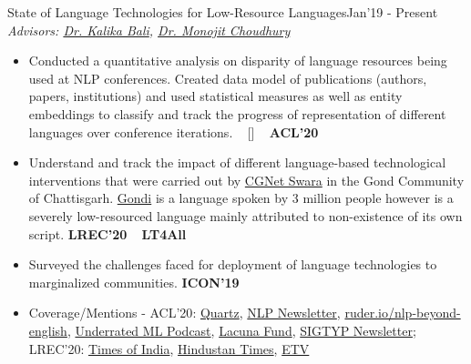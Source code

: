 \begin{projects}
\project
	{State of Language Technologies for Low-Resource Languages}{Jan'19 - Present}
	{
	     \textit{Advisors:  \href{https://www.microsoft.com/en-us/research/people/kalikab/}{Dr. Kalika Bali}, \href{https://www.microsoft.com/en-us/research/people/monojitc/}{Dr. Monojit Choudhury}}
	}
	{\begin{itemize}
	\setlength\itemsep{0.3em}
     \item Conducted a quantitative analysis on disparity of language resources being used at NLP conferences. Created data model of publications (authors, papers, institutions) and used statistical measures as well as entity embeddings to classify and track the progress of representation of different languages over conference iterations. ~ [\href{https://microsoft.github.io/linguisticdiversity/}{\small{\websiteSymbol}}]  ~  {\small{\lbrack\textbf{{ACL'20}}\rbrack}}
     \item Understand and track the impact of different language-based technological interventions that were carried out by \href{http://cgnetswara.org/}{CGNet Swara} in the Gond Community of Chattisgarh. \href{https://en.wikipedia.org/wiki/Gondi_language}{Gondi} is a language spoken by 3 million people however is a severely low-resourced language mainly attributed to non-existence of its own script. {\small{\lbrack\textbf{{LREC'20}}\rbrack}} ~ {\small{\lbrack\textbf{{LT4All}}\rbrack}}
     \item Surveyed the challenges faced for deployment of language technologies to marginalized communities. {\small{\lbrack\textbf{{ICON'19}}\rbrack}}
     \item Coverage/Mentions - {ACL'20}: \href{https://qz.com/1920191/internet-translation-access-creates-a-powerful-digital-divide/}{Quartz},  \href{http://newsletter.ruder.io/issues/reviewing-taking-stock-theme-papers-poisoning-and-stealing-models-multimodal-generation-240687}{NLP Newsletter}, \href{https://ruder.io/nlp-beyond-english/}{ruder.io/nlp-beyond-english}, \href{https://www.underratedml.com/episodes/episode-05-language-independence-and-material-properties}{Underrated ML Podcast}, \href{https://lacunafund.org/language/}{Lacuna Fund}, \href{https://sigtyp.github.io/sigtyp-newsletter-Apr-2020.html}{SIGTYP Newsletter}; {LREC'20}: \href{http://toi.in/HcX74b/a31g}{Times of India}, \href{https://www.hindustantimes.com/india-news/gonds-in-chhattisgarh-get-app-for-news-in-their-language/story-uQEDqDGBIPty7rMCNskTsK.html}{Hindustan Times}, \href{https://www.etvbharat.com/hindi/chhattisgarh/state/raipur/now-tribal-can-hear-news-and-stories-in-their-language/ct20190802191729141}{ETV}
     \end{itemize}}
    
\end{projects}
